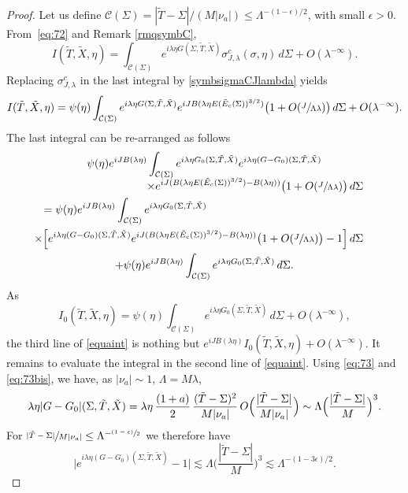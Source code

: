 \begin{proof}
Let us define $\mathcal{C}(\Sigma)=|\tilde T-\Sigma|/(M|\nu_a|)\leq \Lambda^{-(1-\epsilon)/2}$, with small $\epsilon>0$. From~\eqref{eq:72} and Remark \ref{rmqsymbC},
\[
I(\tilde T,\tilde X,\eta)=\int_{\mathcal{C}(\Sigma)}e^{i\lambda \eta G(\Sigma,\tilde T,\tilde X)}\sigma^{c}_{J,\lambda}(\sigma,\eta)\,d\Sigma+O(\lambda^{-\infty}).
\]
Replacing $\sigma^{c}_{J,\lambda}$ in the last integral by \eqref{symbsigmaCJlambda} yields
\[
I(\tilde T,\tilde X,\eta)=\psi(\eta)\int_{\mathcal{C}(\Sigma)}e^{i\lambda \eta G(\Sigma,\tilde T,\tilde X)}e^{iJB(\lambda\eta E(\tilde E_c(\Sigma))^{3/2})}\bigl(1+O(\sfrac{J}{\Lambda\lambda})\bigr)\,d\Sigma+O(\lambda^{-\infty}).
\]
The last integral can be re-arranged as follows
\begin{multline}\label{equaint}
\psi(\eta)e^{iJB(\lambda\eta)}\int_{\mathcal{C}(\Sigma)} e^{i\lambda \eta G_0(\Sigma,\tilde T,\tilde X)} e^{i\lambda \eta (G-G_0)(\Sigma,\tilde T,\tilde X)}
\\[
-5pt]
\shoveright{\times e^{iJ(B(\lambda\eta E(\tilde E_c(\Sigma))^{3/2})-B(\lambda\eta))}\bigl(1+O(\sfrac{J}{\Lambda\lambda})\bigr)\,d\Sigma}\\
\shoveleft{=\psi(\eta)e^{iJB(\lambda\eta)}\int_{\mathcal{C}(\Sigma)}e^{i\lambda \eta G_0(\Sigma,\tilde T,\tilde X)}}\\
\shoveright{\times \Big[e^{i\lambda \eta (G-G_0)(\Sigma,\tilde T,\tilde X)}e^{iJ(B(\lambda\eta E(\tilde E_c(\Sigma))^{3/2})-B(\lambda\eta))}\bigl(1+O(\sfrac{J}{\Lambda\lambda})\bigr)-1\Big]\,d\Sigma}
\\
+\psi(\eta)e^{iJB(\lambda\eta)}\int_{\mathcal{C}(\Sigma)}e^{i\lambda \eta G_0(\Sigma,\tilde T,\tilde X)}\,d\Sigma.
\end{multline}
As
\[
I_0(\tilde T,\tilde X,\eta)=\psi(\eta)\int_{\mathcal{C}(\Sigma)}e^{i\lambda \eta G_0(\Sigma,\tilde T,\tilde X)}\,d\Sigma+O(\lambda^{-\infty}),
\]
the third line of \eqref{equaint} is nothing but $e^{iJB(\lambda\eta)}I_0(\tilde T,\tilde X,\eta)+O(\lambda^{-\infty})$. It remains to evaluate the integral in the second line of \eqref{equaint}. Using \eqref{eq:73} and \eqref{eq:73bis}, we have, as $|\nu_a|\sim 1$, $\Lambda=M\lambda$,
\[
\lambda \eta |G-G_0|(\Sigma,\tilde T,\tilde X)=\lambda \eta\,\frac{(1+a)}{2}\,\frac{(\tilde T-\Sigma)^2}{M|\nu_a|}\,O\Bigl(\frac{|\tilde T-\Sigma|}{M|\nu_a|}\Bigr)\sim \Lambda\Big(\frac{|\tilde T-\Sigma|}{M}\Big)^3.
\]
For $\sfrac{|\tilde T-\Sigma|}{M|\nu_a|}\leq \Lambda^{-\sfrac{(1-\epsilon)}{2}}$ we therefore have
\[
\bigl|e^{i\lambda \eta (G-G_0)(\Sigma,\tilde T,\tilde X)}-1\bigr|\lesssim \Lambda\Big(\frac{|\tilde T-\Sigma|}{M}\Big)^3\lesssim \Lambda^{-(1-3\epsilon)/2}.
\]
\end{proof}
